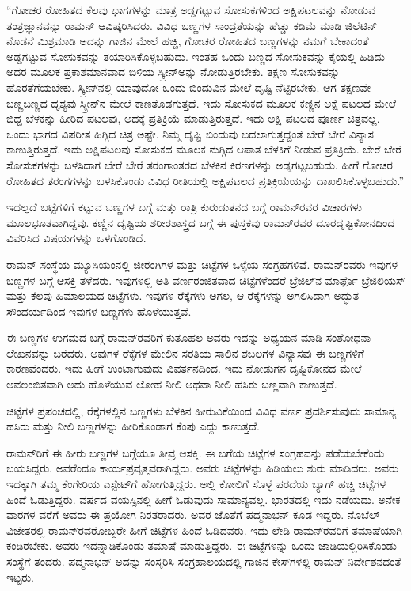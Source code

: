 “ಗೋಚರ ರೋಹಿತದ ಕೆಲವು ಭಾಗಗಳನ್ನು ಮಾತ್ರ ಅಡ್ಡಗಟ್ಟುವ ಸೋಸುಕಗಳಿಂದ ಅಕ್ಷಿಪಟಲವನ್ನು ನೋಡುವ ತಂತ್ರಜ್ಞಾನವನ್ನು ರಾಮನ್ ಆವಿಷ್ಕರಿಸಿದರು. ವಿವಿಧ ಬಣ್ಣಗಳ ಸಾಂದ್ರತೆಯನ್ನು ಹೆಚ್ಚು ಕಡಿಮೆ ಮಾಡಿ ಜಿಲೆಟಿನ್ ನೊಡನೆ ಮಿಶ್ರಮಾಡಿ ಅದನ್ನು ಗಾಜಿನ ಮೇಲೆ ಹಚ್ಚಿ, ಗೋಚರ ರೋಹಿತದ ಬಣ್ಣಗಳನ್ನು ನಮಗೆ ಬೇಕಾದಂತೆ ಅಡ್ಡಗಟ್ಟುವ ಸೋಸುಕವನ್ನು ತಯಾರಿಸಿಕೊಳ್ಳಬಹುದು. ಇಂತಹ ಒಂದು ಬಣ್ಣದ ಸೋಸುಕವನ್ನು ಕೈಯಲ್ಲಿ ಹಿಡಿದು ಅದರ ಮೂಲಕ ಪ್ರಕಾಶಮಾನವಾದ ಬಿಳಿಯ ಸ್ಕ್ರೀನ್‍ಅನ್ನು ನೋಡುತ್ತಿರಬೇಕು. ತಕ್ಷಣ ಸೋಸುಕವನ್ನು ಹೊರತೆಗೆಯಬೇಕು. ಸ್ಕ್ರೀನ್‍ನಲ್ಲಿ ಯಾವುದೋ ಒಂದು ಬಿಂದುವಿನ ಮೇಲೆ ದೃಷ್ಟಿ ನೆಟ್ಟಿರಬೇಕು. ಆಗ ತಕ್ಷಣವೇ ಬಣ್ಣಬಣ್ಣದ ದೃಶ್ಯವು ಸ್ಕ್ರೀನ್‍ನ ಮೇಲೆ ಕಾಣತೊಡಗುತ್ತದೆ. ಇದು ಸೋಸುಕದ ಮೂಲಕ ಕಣ್ಣಿನ ಅಕ್ಷೆ ಪಟಲದ ಮೇಲೆ ಬಿದ್ದ ಬೆಳಕನ್ನು ಹೀರಿದ ಪಟಲವು, ಅದಕ್ಕೆ ಪ್ರತಿಕ್ರಿಯೆ ಮಾಡುತ್ತಿರುತ್ತದೆ. ಇದು ಅಕ್ಷಿ ಪಟಲದ ಪೂರ್ಣ ಚಿತ್ರವಲ್ಲ. ಒಂದು ಭಾಗದ ವಿಪರೀತ ಹಿಗ್ಗಿದ ಚಿತ್ರ ಅಷ್ಟೇ. ನಿಮ್ಮ ದೃಷ್ಟಿ ಬಿಂದುವು ಬದಲಾಗುತ್ತದ್ದಂತೆ ಬೇರೆ ಬೇರೆ ವಿನ್ಯಾಸ ಕಾಣುತ್ತಿರುತ್ತದೆ. ಇದು ಅಕ್ಷಿಪಟಲವು ಸೋಸುಕದ ಮೂಲಕ ನುಗ್ಗಿದ ಆಪಾತ ಬೆಳಕಿಗೆ ನೀಡುವ ಪ್ರತಿಕ್ರಿಯೆ. ಬೇರೆ ಬೇರೆ ಸೋಸುಕಗಳನ್ನು ಬಳಸಿದಾಗ ಬೇರೆ ಬೇರೆ ತರಂಗಾಂತರದ ಬೆಳಕಿನ ಕಿರಣಗಳನ್ನು ಅಡ್ಡಗಟ್ಟಬಹುದು. ಹೀಗೆ ಗೋಚರ ರೋಹಿತದ ತರಂಗಗಳನ್ನು ಬಳಸಿಕೊಂಡು ವಿವಿಧ ರೀತಿಯಲ್ಲಿ ಅಕ್ಷಿಪಟಲದ ಪ್ರತಿಕ್ರಿಯೆಯನ್ನು ದಾಖಲಿಸಿಕೊಳ್ಳಬಹುದು.”

ಇದಲ್ಲದೆ ಬಟ್ಟೆಗಳಿಗೆ ಕಟ್ಟುವ ಬಣ್ಣಗಳ ಬಗ್ಗೆ ಮತ್ತು ರಾತ್ರಿ ಕುರುಡುತನದ ಬಗ್ಗೆ ರಾಮನ್‍ರವರ ವಿಚಾರಗಳು ಮೂಲಭೂತವಾಗಿದ್ದವು. ಕಣ್ಣಿನ ದೃಷ್ಟಿಯ ಶರೀರಶಾಸ್ತ್ರದ ಬಗ್ಗೆ ಈ ಪುಸ್ತಕವು ರಾಮನ್‍ರವರ ದೂರದೃಷ್ಟಿಕೋನದಿಂದ ವಿವರಿಸಿದ ವಿಷಯಗಳನ್ನು ಒಳಗೊಂಡಿದೆ.



ರಾಮನ್ ಸಂಸ್ಥೆಯ ಮ್ಯೂಸಿಯಂನಲ್ಲಿ ಜೀರಂಗಿಗಳ ಮತ್ತು ಚಿಟ್ಟೆಗಳ ಒಳ್ಳೆಯ ಸಂಗ್ರಹಗಳಿವೆ. ರಾಮನ್‍ರವರು ಇವುಗಳ ಬಣ್ಣಗಳ ಬಗ್ಗೆ ಆಸಕ್ತಿ ತಳೆದರು. ಇವುಗಳಲ್ಲಿ ಅತಿ ವರ್ಣರಂಜಿತವಾದ ಚಿಟ್ಟೆಗಳೆಂದರೆ ಬ್ರೆಜಿಲ್‍ನ ಮಾರ್ಫೊ ಬ್ರೆಜಿಲಿಯಸ್ ಮತ್ತು ಕೆಲವು ಹಿಮಾಲಯದ ಚಿಟ್ಟೆಗಳು. ಇವುಗಳ ರೆಕ್ಕೆಗಳು ಅಗಲ, ಆ ರೆಕ್ಕೆಗಳನ್ನು ಅಗಲಿಸಿದಾಗ ಅದ್ಭುತ ಸೌಂದರ್ಯದಿಂದ ಇವುಗಳ ಬಣ್ಣಗಳು ಹೊಳೆಯುತ್ತವೆ.

ಈ ಬಣ್ಣಗಳ ಉಗಮದ ಬಗ್ಗೆ ರಾಮನ್‍ರವರಿಗೆ ಕುತೂಹಲ ಅವರು ಇದನ್ನು ಅಧ್ಯಯನ ಮಾಡಿ ಸಂಶೋಧನಾ ಲೇಖನವನ್ನು ಬರೆದರು. ಅವುಗಳ ರೆಕ್ಕೆಗಳ ಮೇಲಿನ ಸರತಿಯ ಸಾಲಿನ ಶಬಲಗಳ ವಿನ್ಯಾಸವು ಈ ಬಣ್ಣಗಳಿಗೆ ಕಾರಣವೆಂದರು. ಇದು ಹೀಗೆ ಉಂಟಾಗುವುದು ವಿವರ್ತನದಿಂದ. ಇದು ನೋಡುಗನ ದೃಷ್ಟಿಕೋನದ ಮೇಲೆ ಅವಲಂಬಿತವಾಗಿ ಅದು ಹೊಳೆಯುವ ಲೋಹ ನೀಲಿ ಅಥವಾ ನೀಲಿ ಹಸಿರು ಬಣ್ಣವಾಗಿ ಕಾಣುತ್ತದೆ.

ಚಿಟ್ಟೆಗಳ ಪ್ರಪಂಚದಲ್ಲಿ, ರೆಕ್ಕೆಗಳಲ್ಲಿನ ಬಣ್ಣಗಳು ಬೆಳಕಿನ ಹೀರುವಿಕೆಯಿಂದ ವಿವಿಧ ವರ್ಣ ಪ್ರದರ್ಶಿಸುವುದು ಸಾಮಾನ್ಯ. ಹಸಿರು ಮತ್ತು ನೀಲಿ ಬಣ್ಣಗಳನ್ನು ಹೀರಿಕೊಂಡಾಗ ಕೆಂಪು ಎದ್ದು ಕಾಣುತ್ತದೆ.

ರಾಮನ್‍ರಿಗೆ ಈ ಹೀರು ಬಣ್ಣಗಳ ಬಗ್ಗೆಯೂ ತೀವ್ರ ಆಸಕ್ತಿ. ಈ ಬಗೆಯ ಚಿಟ್ಟೆಗಳ ಸಂಗ್ರಹವನ್ನು ಪಡೆಯಬೇಕೆಂದು ಬಯಸಿದ್ದರು. ಅವರೆಂದೂ ಕಾರ್ಯಪ್ರವೃತ್ತವರಾಗಿದ್ದರು. ಅವರು ಚಿಟ್ಟೆಗಳನ್ನು ಹಿಡಿಯಲು ಶುರು ಮಾಡಿದರು. ಅವರು ಇದಕ್ಕಾಗಿ ತಮ್ಮ ಕೆಂಗೇರಿಯ ಎಸ್ಟೇಟ್‍ಗೆ ಹೋಗುತ್ತಿದ್ದರು. ಅಲ್ಲಿ ಕೋಲಿಗೆ ಸೊಳ್ಳೆ ಪರದೆಯ ಬ್ಯಾಗ್ ಹಚ್ಚಿ ಚಿಟ್ಟೆಗಳ ಹಿಂದೆ ಓಡುತ್ತಿದ್ದರು.  ವರ್ಷದ ವಯಸ್ಸಿನಲ್ಲಿ ಹೀಗೆ ಓಡುವುದು ಸಾಮಾನ್ಯವಲ್ಲ. ಭಾರತದಲ್ಲಿ ಇದು ನಡೆಯದು. ಅನೇಕ ವಾರಗಳ ವರೆಗೆ ಅವರು ಈ ಪ್ರಯೋಗ ನಿರತರಾದರು. ಅವರ ಜೊತೆಗೆ ಪದ್ಮನಾಭನ್ ಕೂಡ ಇದ್ದರು. ನೊಬೆಲ್ ವಿಜೇತರಲ್ಲಿ ರಾಮನ್‍ರವರೋಬ್ಬರೇ ಹೀಗೆ ಚಿಟ್ಟೆಗಳ ಹಿಂದೆ ಓಡಿದವರು. ಇದು ಲೇಡಿ ರಾಮನ್‍ರವರಿಗೆ ತಮಾಷೆಯಾಗಿ ಕಂಡಿರಬೇಕು. ಅವರು ಇದನ್ನಾಡಿಕೊಂಡು ತಮಾಷೆ ಮಾಡುತ್ತಿದ್ದರು. ಈ ಚಿಟ್ಟೆಗಳನ್ನು ಒಂದು ಜಾಡಿಯಲ್ಲಿರಿಸಿಕೊಂಡು ಸಂಸ್ಥೆಗೆ ತಂದರು. ಪದ್ಮನಾಭನ್ ಅದನ್ನು ಸಂಸ್ಕರಿಸಿ ಸಂಗ್ರಹಾಲಯದಲ್ಲಿ ಗಾಜಿನ ಕೇಸ್‍ಗಳಲ್ಲಿ ರಾಮನ್ ನಿರ್ದೇಶನದಂತೆ ಇಟ್ಟರು.


